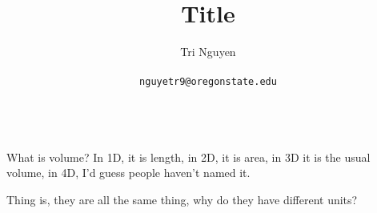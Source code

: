 \documentclass[11pt,a4paper]{article}
\title{Title}
\author{	Tri Nguyen \\\\
        \texttt{nguyetr9@oregonstate.edu} \\\\
        }
\begin{document}
\maketitle

What is volume? In 1D, it is length, in 2D, it is area, in 3D it is the usual volume, in 4D, I'd guess people haven't named it.

Thing is, they are all the same thing, why do they have different units?
\end{document}
